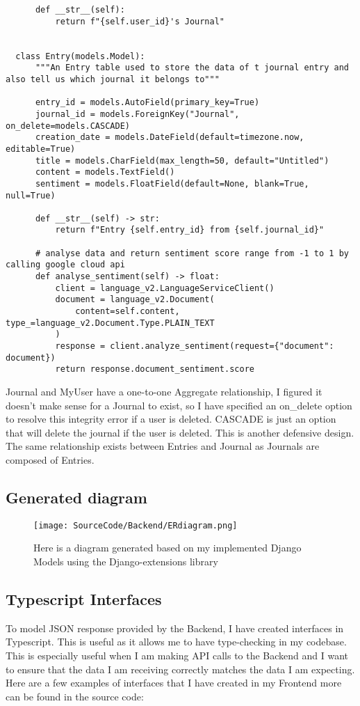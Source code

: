 \begin{verbatim}
      def __str__(self):
          return f"{self.user_id}'s Journal"
  
  
  class Entry(models.Model):
      """An Entry table used to store the data of t journal entry and also tell us which journal it belongs to"""
  
      entry_id = models.AutoField(primary_key=True)
      journal_id = models.ForeignKey("Journal", on_delete=models.CASCADE)
      creation_date = models.DateField(default=timezone.now, editable=True)
      title = models.CharField(max_length=50, default="Untitled")
      content = models.TextField()
      sentiment = models.FloatField(default=None, blank=True, null=True)
  
      def __str__(self) -> str:
          return f"Entry {self.entry_id} from {self.journal_id}"
  
      # analyse data and return sentiment score range from -1 to 1 by calling google cloud api
      def analyse_sentiment(self) -> float:
          client = language_v2.LanguageServiceClient()
          document = language_v2.Document(
              content=self.content, type_=language_v2.Document.Type.PLAIN_TEXT
          )
          response = client.analyze_sentiment(request={"document": document})
          return response.document_sentiment.score
\end{verbatim}

Journal and MyUser have a one-to-one Aggregate relationship, I figured it doesn't make sense for a Journal to exist, so I have specified an on\_delete option to resolve this integrity error if a user is deleted. CASCADE is just an option that will delete the journal if the user is deleted. This is another defensive design. The same relationship exists between Entries and Journal as Journals are composed of Entries.


\subsection{Generated diagram}

\begin{figure}[H]
  \centering
  \texttt{[image: SourceCode/Backend/ERdiagram.png]}
  \caption{Here is a diagram generated based on my implemented Django Models using the Django-extensions library}
  \label{fig:ERdiagram}
\end{figure}

\subsection{Typescript Interfaces}
To model JSON response provided by the Backend, I have created interfaces in Typescript. This is useful as it allows me to have type-checking in my codebase. This is especially useful when I am making API calls to the Backend and I want to ensure that the data I am receiving correctly matches the data I am expecting. Here are a few examples of interfaces that I have created in my Frontend more can be found in the source code:

